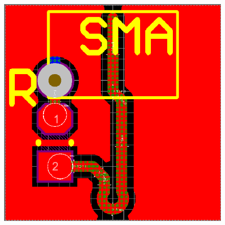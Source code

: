 \begin{figure}[htb!]
{		\includegraphics[scale=0.28]{./img/1B_layers}
		\label{fig:1B_layers}}
\end{figure}

